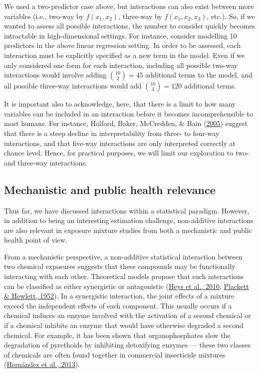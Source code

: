 \documentclass[12pt, twoside]{amherstthesis}
\begin{document}
We used a two-predictor case above, but interactions can also exist between more variables (i.e., two-way by \(f(x_1, x_2)\), three-way by \(f(x_1, x_2, x_3)\), etc.). So, if we wanted to assess all possible interactions, the number to consider quickly becomes intractable in high-dimensional settings. For instance, consider modelling 10 predictors in the above linear regression setting. In order to be assessed, each interaction must be explicitly specified as a new term in the model. Even if we only considered one form for each interaction, including all possible two-way interactions would involve adding \(\binom{10}{2} = 45\) additional terms to the model, and all possible three-way interactions would add \(\binom{10}{3} = 120\) additional terms.

It is important also to acknowledge, here, that there is a limit to how many variables can be included in an interaction before it becomes incomprehensible to most humans. For instance, Halford, Baker, McCredden, \& Bain (\protect\hyperlink{ref-halford_how_2005}{2005}) suggest that there is a steep decline in interpretability from three- to four-way interactions, and that five-way interactions are only interpreted correctly at chance level. Hence, for practical purposes, we will limit our exploration to two- and three-way interactions.

\hypertarget{mechanistic-and-public-health-relevance}{%
\subsection{Mechanistic and public health relevance}\label{mechanistic-and-public-health-relevance}}

Thus far, we have discussed interactions within a statistical paradigm. However, in addition to being an interesting estimation challenge, non-additive interactions are also relevant in exposure mixture studies from both a mechanistic and public health point of view.

From a mechanistic perspective, a non-additive statistical interaction between two chemical exposures suggests that these compounds may be functionally interacting with each other. Theoretical models propose that such interactions can be classified as either synergistic or antagonistic (\protect\hyperlink{ref-heys_risk_2016}{Heys et al., 2016}; \protect\hyperlink{ref-plackett_quantal_1952}{Plackett \& Hewlett, 1952}). In a synergistic interaction, the joint effects of a mixture exceed the independent effects of each component. This usually occurs if a chemical induces an enzyme involved with the activation of a second chemical or if a chemical inhibits an enzyme that would have otherwise degraded a second chemical. For example, it has been shown that organophosphates slow the degradation of pyrethoids by inhibiting detoxifying enzymes --- these two classes of chemicals are often found together in commercial insecticide mixtures (\protect\hyperlink{ref-hernandez_toxic_2013}{Hernández et al., 2013}).
\end{document}
